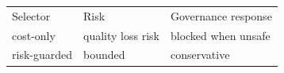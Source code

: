 \begin{tabular}{lll}Selector & Risk & Governance response \\ cost-only & quality loss risk & blocked when unsafe \\ risk-guarded & bounded & conservative \\\end{tabular}
